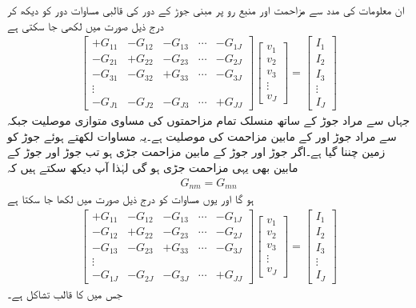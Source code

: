 ان معلومات کی مدد سے  مزاحمت اور منبع رو پر مبنی  جوڑ کے دور کی قالبی مساوات  دور کو دیکھ کر درج ذیل صورت میں لکھی جا سکتی ہے
\begin{align}\label{مساوات_جوڑ_عمومی_قالبی_مساوات_الف}
\begin{bmatrix}
+G_{11} & -G_{12} & -G_{13} & \cdots & -G_{1J}\\
-G_{21} & +G_{22} & -G_{23} & \cdots & -G_{2J}\\
-G_{31} & -G_{32} & +G_{33} & \cdots & -G_{3J}\\
\vdots\\
-G_{J1} & -G_{J2} & -G_{J3} & \cdots & +G_{JJ}
\end{bmatrix}
\begin{bmatrix}
v_1\\
v_2\\
v_3\\
\vdots\\
v_J
\end{bmatrix}
=
\begin{bmatrix}
I_1\\
I_2\\
I_3\\
\vdots\\
I_J
\end{bmatrix}
\end{align} 
جہاں  سے مراد جوڑ  کے ساتھ منسلک تمام مزاحمتوں کی مساوی متوازی موصلیت جبکہ  سے مراد جوڑ  اور  کے مابین مزاحمت کی موصلیت ہے۔یہ مساوات لکھتے ہوئے جوڑ  کو زمین چننا گیا ہے۔اگر جوڑ  اور جوڑ  کے مابین مزاحمت  جڑی ہو تب جوڑ  اور جوڑ  کے مابین بھی یہی مزاحمت جڑی ہو گی لہٰذا آپ دیکھ سکتے ہیں کہ 
\begin{align}
G_{nm}=G_{mn}
\end{align}
ہو گا اور یوں مساوات  کو درج ذیل صورت میں لکھا جا سکتا ہے
\begin{align}\label{مساوات_جوڑ_عمومی_قالبی_مساوات_ب}
\begin{bmatrix}
+G_{11} & -G_{12} & -G_{13} & \cdots & -G_{1J}\\
-G_{12} & +G_{22} & -G_{23} & \cdots & -G_{2J}\\
-G_{13} & -G_{23} & +G_{33} & \cdots & -G_{3J}\\
\vdots\\
-G_{1J} & -G_{2J} & -G_{3J} & \cdots & +G_{JJ}
\end{bmatrix}
\begin{bmatrix}
v_1\\
v_2\\
v_3\\
\vdots\\
v_J
\end{bmatrix}
=
\begin{bmatrix}
I_1\\
I_2\\
I_3\\
\vdots\\
I_J
\end{bmatrix}
\end{align}
جس میں  کا قالب تشاکل ہے۔

